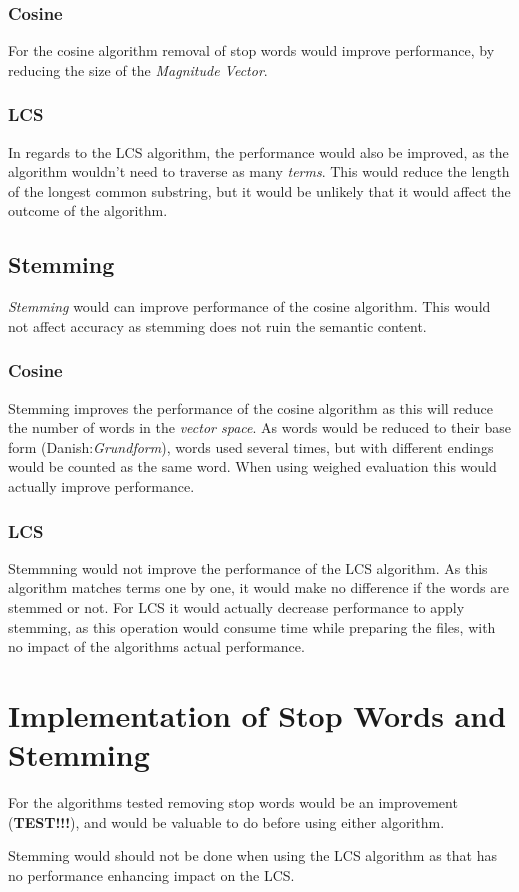\subsubsection{Cosine}
For the cosine algorithm removal of stop words would improve performance, by reducing the size of the \textit{Magnitude Vector}. 

\subsubsection{LCS}
In regards to the LCS algorithm, the performance would also be improved, as the algorithm wouldn't need to traverse as many \textit{terms}. This would reduce the length of the longest common substring, but it would be unlikely that it would affect the outcome of the algorithm.

\subsection{Stemming}
\textit{Stemming} would can improve performance of the cosine algorithm. This would not affect accuracy as stemming does not ruin the semantic content.

\subsubsection{Cosine}
Stemming improves the performance of the cosine algorithm as this will reduce the number of words in the \textit{vector space}. As words would be reduced to their base form (Danish:\textit{Grundform}), words used several times, but with different endings would be counted as the same word. When using weighed evaluation this would actually improve performance.

\subsubsection{LCS}
Stemmning would not improve the performance of the LCS algorithm. As this algorithm matches terms one by one, it would make no difference if the words are stemmed or not. For LCS it would actually decrease performance to apply stemming, as this operation would consume time while preparing the files, with no impact of the algorithms actual performance.

\section{Implementation of Stop Words and Stemming}
For the algorithms tested removing stop words would be an improvement (\textbf{TEST!!!}), and would be valuable to do before using either algorithm.

Stemming would should not be done when using the LCS algorithm as that has no performance enhancing impact on the LCS.



